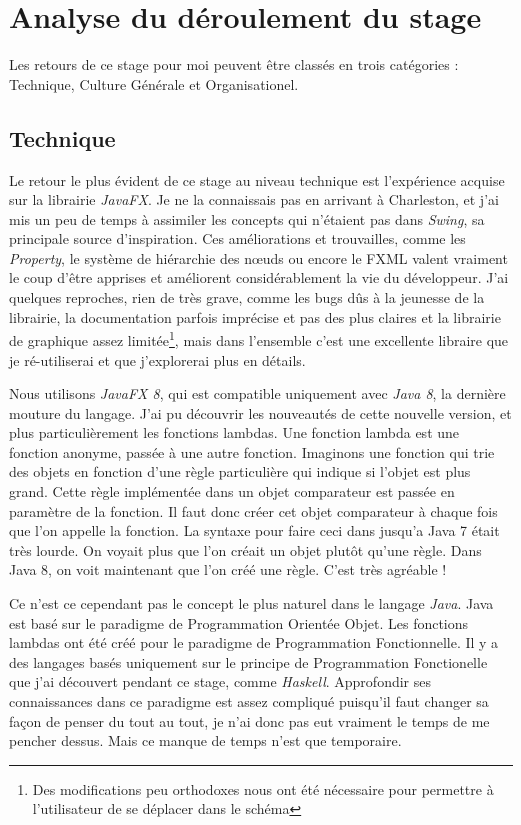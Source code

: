 ﻿\chapter{Analyse du déroulement du stage}
Les retours de ce stage pour moi peuvent être classés en trois catégories : Technique, Culture Générale et Organisationel.

\section{Technique}
Le retour le plus évident de ce stage au niveau technique est l'expérience acquise sur la librairie \textit{JavaFX}. Je ne la connaissais pas en arrivant à Charleston, et j'ai mis un peu de temps à assimiler les concepts qui n'étaient pas dans \textit{Swing}, sa principale source d'inspiration. Ces améliorations et trouvailles, comme les \textit{Property}, le système de hiérarchie des nœuds ou encore le FXML valent vraiment le coup d'être apprises et améliorent considérablement la vie du développeur. J'ai quelques reproches, rien de très grave, comme les bugs dûs à la jeunesse de la librairie, la documentation parfois imprécise et pas des plus claires et la librairie de graphique assez limitée\footnote{Des modifications peu orthodoxes nous ont été nécessaire pour permettre à l'utilisateur de se déplacer dans le schéma}, mais dans l'ensemble c'est une excellente libraire que je ré-utiliserai et que j'explorerai plus en détails.

Nous utilisons \textit{JavaFX 8}, qui est compatible uniquement avec \textit{Java 8}, la dernière mouture du langage. J'ai pu découvrir les nouveautés de cette nouvelle version, et plus particulièrement les fonctions lambdas. Une fonction lambda est une fonction anonyme, passée à une autre fonction. Imaginons une fonction qui trie des objets en fonction d'une règle particulière qui indique si l'objet est plus grand. Cette règle implémentée dans un objet comparateur est passée en paramètre de la fonction. Il faut donc créer cet objet comparateur à chaque fois que l'on appelle la fonction. La syntaxe pour faire ceci dans jusqu'a Java 7 était très lourde. On voyait plus que l'on créait un objet plutôt qu'une règle. Dans Java 8, on voit maintenant que l'on créé une règle. C'est très agréable !

Ce n'est ce cependant pas le concept le plus naturel dans le langage \textit{Java}. Java est basé sur le paradigme de Programmation Orientée Objet. Les fonctions lambdas ont été créé pour le paradigme de Programmation Fonctionnelle. Il y a des langages basés uniquement sur le principe de Programmation Fonctionelle que j'ai découvert pendant ce stage, comme \textit{Haskell}. Approfondir ses connaissances dans ce paradigme est assez compliqué puisqu'il faut changer sa façon de penser du tout au tout, je n'ai donc pas eut vraiment le temps de me pencher dessus. Mais ce manque de temps n'est que temporaire.

